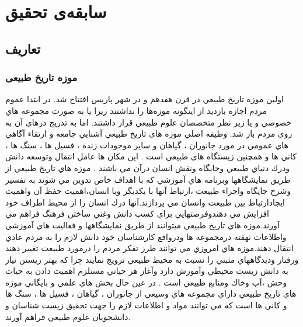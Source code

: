 
\chapter{سابقه‌ی تحقیق} \label{chapter:related-works}

\paragraph*{}
\section{تعاریف}

\subsection{موزه تاریخ طبیعی}
اولين موزه تاريخ طبيعي در قرن
هفدهم و در شهر پاريس افتتاح شد.
در ابتدا عموم مردم اجازه بازديد از اينگونه موزه‌ها را نداشتند زيرا يا به
صورت مجموعه هاي خصوصي و يا زير نظر متخصصان علوم طبيعي قرار داشتند. اما به تدريج درهاي آن به
روي مردم باز شد.
وظيفه اصلي موزه هاي تاريخ طبيعي آشنايي جامعه و ارتقاء آگاهي هاي عمومي در مورد جانوران ، گياهان و 
ساير موجودات زنده ، فسيل ها ، سنگ ها ، كاني ها و همچنين زيستگاه هاي طبيعي است . اين مكان ها 
عامل انتقال وتوسعه دانش ودرك دنياي طبيعي وجايگاه ونقش انسان درآن مي باشند . موزه هاي تاريخ طبيعي
از طريق نمايشگاهها وبرنامه هاي آموزشي كه با اهداف خاص تدوين مي شوند به تفسير وشرح جايگاه واجزاء
طبيعت ،ارتباط آنها با يكديگر وبا انسان،اهميت حفظ آن واهميت ايجادارتباط بين طبيعت وانسان مي
پردازند.آنها درك انسان را از محيط اطراف خود افزايش مي دهندوفرصتهايي براي كسب دانش وغني ساختن
فرهنگ فراهم مي آورند.موزه هاي تاريخ طبيعي ميتوانند از طريق نمايشگاهها و فعاليت هاي آموزشي واطلاعات
نهفته درمجموعه ها ودرواقع كارشناسان خود دانش لازم را به مردم عادي انتقال دهند.موزه هاي امروزي مي
توانند طرز تفكر مردم را درمورد طبيعت تغيير دهند ورفتار وديدگاههاي مثبتي را نسبت به محيط طبيعي
ترويج نمايند چرا كه بهتر زيستن نياز به دانش زيست محيطي وآموزش دارد وآغاز هر حياتي مستلزم اهميت
دادن به حيات وحش ،آب وخاك ومنابع طبيعي است . در عين حال بخش هاي علمي و بايگاني موزه هاي تاريخ
طبيعي داراي مجموعه هاي وسيعي از جانوران ، گياهان ، فسيل ها ، سنگ ها و كاني ها است كه مي توانند مواد
و اطلاعات لازم را جهت تحقيق زيست شناسان و دانشجويان علوم طبيعي فراهم آورند.
